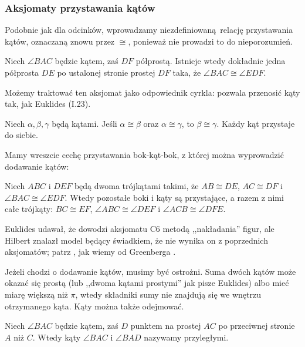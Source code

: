 \subsubsection{Aksjomaty przystawania kątów}
Podobnie jak dla odcinków, wprowadzamy niezdefiniowaną relację przystawania kątów, oznaczaną znowu przez $\cong$, ponieważ nie prowadzi to do nieporozumień.

\begin{axiom}[przystawania, C4]
    Niech $\angle BAC$ będzie kątem, zaś $DF$ półprostą.
    Istnieje wtedy dokładnie jedna półprosta $DE$ po ustalonej stronie prostej $DF$ taka, że $\angle BAC \cong \angle EDF$.
\end{axiom}

Możemy traktować ten aksjomat jako odpowiednik cyrkla: pozwala przenosić kąty tak, jak Euklides (I.23).

\begin{axiom}[przystawania, C5]
    Niech $\alpha, \beta, \gamma$ będą kątami.
    Jeśli $\alpha \cong \beta$ oraz $\alpha \cong \gamma$, to $\beta \cong \gamma$.
    Każdy kąt przystaje do siebie.
\end{axiom}

Mamy wreszcie cechę przystawania bok-kąt-bok, z której można wyprowadzić dodawanie kątów:

\begin{axiom}[przystawania, C6]
    Niech $ABC$ i $DEF$ będą dwoma trójkątami takimi, że $AB \cong DE$, $AC \cong DF$ i $\angle BAC \cong \angle EDF$.
    Wtedy pozostałe boki i kąty są przystające, a razem z nimi całe trójkąty: $BC \cong EF$, $\angle ABC \cong \angle DEF$ i $\angle ACB \cong \angle DFE$.
\end{axiom}

Euklides udawał, że dowodzi aksjomatu C6 metodą ,,nakładania'' figur, ale Hilbert znalazł model będący świadkiem, że nie wynika on z poprzednich aksjomatów; patrz \cite[paragraf 11]{hilbert_1988}, jak wiemy od Greenberga \cite[s. 200]{greenberg_2010}.

Jeżeli chodzi o dodawanie kątów, musimy być ostrożni.
Suma dwóch kątów może okazać się prostą (lub ,,dwoma kątami prostymi'' jak pisze Euklides) albo mieć miarę większą niż $\pi$, wtedy składniki sumy nie znajdują się we wnętrzu otrzymanego kąta.
Kąty można także odejmować.

\begin{definition}
    Niech $\angle BAC$ będzie kątem, zaś $D$ punktem na prostej $AC$ po przeciwnej stronie $A$ niż $C$.
    Wtedy kąty $\angle BAC$ i $\angle BAD$ nazywamy przyległymi. %
\end{definition}

